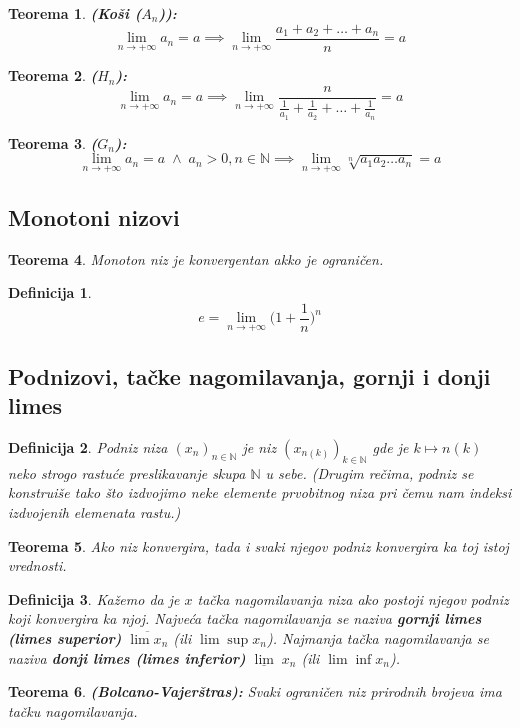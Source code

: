 \documentclass[a4paper,12pt,twoside]{report}
\newtheorem{theorem}{Teorema}[section]
\newtheorem{definition}{Definicija}[section]
\numberwithin{algorithm}{section}
\begin{document}
\begin{theorem}
    \textbf{(Koši ($A_n$)): }\[\lim_{n\to +\infty}a_n = a \implies \lim_{n\to +\infty}\frac{a_1+a_2+\dots+a_n}{n} = a\]
\end{theorem}
\begin{theorem}
    \textbf{($H_n$): }\[\lim_{n\to +\infty}a_n = a \implies \lim_{n\to +\infty} \frac{n}{\frac{1}{a_1} + \frac{1}{a_2} + \dots + \frac{1}{a_n}} = a\]
\end{theorem}
\begin{theorem}
    \textbf{($G_n$): }\[\lim_{n\to +\infty} a_n=a \; \land \; a_n>0, n\in \mathbb{N} \implies \lim_{n\to +\infty} \sqrt[n]{a_1a_2 \dots a_n} = a\]
\end{theorem}

\subsection{Monotoni nizovi}
\begin{theorem}
    Monoton niz je konvergentan akko je ograničen.
\end{theorem}
\begin{definition}
    \[ e = \lim_{n \to +\infty} \bigg(1 + \frac{1}{n} \bigg)^n \]
\end{definition}

\subsection{Podnizovi, tačke nagomilavanja, gornji i donji limes}
\begin{definition}
    Podniz niza $(x_n)_{n \in \mathbb{N}}$ je niz $(x_{n(k)})_{k \in \mathbb{N}}$ gde je $k \mapsto n(k)$ neko strogo rastuće preslikavanje skupa $\mathbb{N}$ u sebe. (Drugim rečima, podniz se konstruiše tako što izdvojimo neke elemente prvobitnog niza pri čemu nam indeksi izdvojenih elemenata rastu.)
\end{definition}
\begin{theorem}
    Ako niz konvergira, tada i svaki njegov podniz konvergira ka toj istoj vrednosti.
\end{theorem}
\begin{definition}
    Kažemo da je $x$ tačka nagomilavanja niza ako postoji njegov podniz koji konvergira ka njoj. Najveća tačka nagomilavanja se naziva \textbf{gornji limes (limes superior)} $\overline{\lim {x_n}}$ (ili $\lim \sup x_n$).
    Najmanja tačka nagomilavanja se naziva \textbf{donji limes (limes inferior)} $\underline{\lim} \;{x_n}$ (ili $\lim \inf x_n$).
\end{definition}
\begin{theorem}
    \textbf{(Bolcano-Vajerštras): } Svaki ograničen niz prirodnih brojeva ima tačku nagomilavanja.
\end{theorem}
\end{document}

